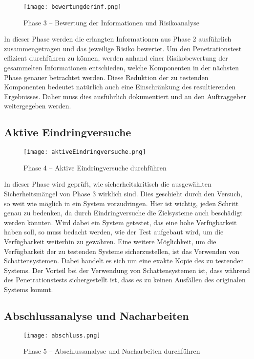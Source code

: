 \begin{figure}[h]
	\centering
	\texttt{[image: bewertungderinf.png]}
	\caption{Phase 3 – Bewertung der Informationen und Risikoanalyse}
\end{figure}

In dieser Phase werden die erlangten Informationen aus Phase 2 ausführlich zusammengetragen und das
jeweilige Risiko bewertet. Um den Penetrationstest effizient durchführen zu können, werden anhand einer
Risikobewertung der gesammelten Informationen entschieden, welche Komponenten in der nächsten Phase
genauer betrachtet werden. Diese Reduktion der zu testenden Komponenten bedeutet natürlich auch eine Einschränkung
des resultierenden Ergebnisses. Daher muss dies ausführlich dokumentiert und an den Auftraggeber
weitergegeben werden.

\subsection{Aktive Eindringversuche}

\begin{figure}[h]
	\centering
	\texttt{[image: aktiveEindringversuche.png]}
	\caption{Phase 4 – Aktive Eindringversuche durchführen}
\end{figure}

In dieser Phase wird geprüft, wie sicherheitskritisch die ausgewählten Sicherheitsmängel von Phase 3 wirklich
sind. Dies geschieht durch den Versuch, so weit wie möglich in ein System vorzudringen. Hier ist wichtig,
jeden Schritt genau zu bedenken, da durch Eindringversuche die Zielsysteme auch beschädigt werden könnten.
Wird dabei ein System getestet, das eine hohe Verfügbarkeit haben soll, so muss bedacht werden, wie der Test
aufgebaut wird, um die Verfügbarkeit weiterhin zu gewähren. Eine weitere Möglichkeit, um die Verfügbarkeit
der zu testenden Systeme sicherzustellen, ist das Verwenden von Schattensystemen. Dabei handelt es sich um
eine exakte Kopie des zu testenden Systems. Der Vorteil bei der Verwendung von Schattensystemen ist, dass
während des Penetrationstests sichergestellt ist, dass es zu keinen Ausfällen des originalen Systems kommt.

\subsection{Abschlussanalyse und Nacharbeiten}

\begin{figure}[h]
	\centering
	\texttt{[image: abschluss.png]}
	\caption{Phase 5 – Abschlussanalyse und Nacharbeiten durchführen}
\end{figure}

